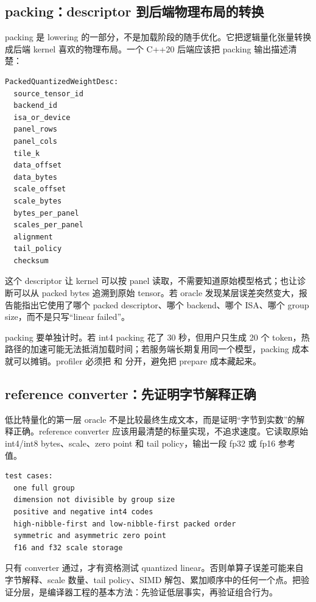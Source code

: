 \subsection{packing：descriptor 到后端物理布局的转换}

packing 是 lowering 的一部分，不是加载阶段的随手优化。它把逻辑量化张量转换成后端 kernel 喜欢的物理布局。一个 C++20 后端应该把 packing 输出描述清楚：

\begin{lstlisting}[numbers=none,caption={PackedQuantizedWeightDesc 的最小内容}]
PackedQuantizedWeightDesc:
  source_tensor_id
  backend_id
  isa_or_device
  panel_rows
  panel_cols
  tile_k
  data_offset
  data_bytes
  scale_offset
  scale_bytes
  bytes_per_panel
  scales_per_panel
  alignment
  tail_policy
  checksum
\end{lstlisting}

这个 descriptor 让 kernel 可以按 panel 读取，不需要知道原始模型格式；也让诊断可以从 packed bytes 追溯到原始 tensor。若 oracle 发现某层误差突然变大，报告能指出它使用了哪个 packed descriptor、哪个 backend、哪个 ISA、哪个 group size，而不是只写“linear failed”。

packing 要单独计时。若 int4 packing 花了 30 秒，但用户只生成 20 个 token，热路径的加速可能无法抵消加载时间；若服务端长期复用同一个模型，packing 成本就可以摊销。profiler 必须把  和  分开，避免把 prepare 成本藏起来。

\subsection{reference converter：先证明字节解释正确}

低比特量化的第一层 oracle 不是比较最终生成文本，而是证明“字节到实数”的解释正确。reference converter 应该用最清楚的标量实现，不追求速度。它读取原始 int4/int8 bytes、scale、zero point 和 tail policy，输出一段 fp32 或 fp16 参考值。

\begin{lstlisting}[numbers=none,caption={reference converter 的测试输入}]
test cases:
  one full group
  dimension not divisible by group size
  positive and negative int4 codes
  high-nibble-first and low-nibble-first packed order
  symmetric and asymmetric zero point
  f16 and f32 scale storage
\end{lstlisting}

只有 converter 通过，才有资格测试 quantized linear。否则单算子误差可能来自字节解释、scale 数量、tail policy、SIMD 解包、累加顺序中的任何一个点。把验证分层，是编译器工程的基本方法：先验证低层事实，再验证组合行为。

